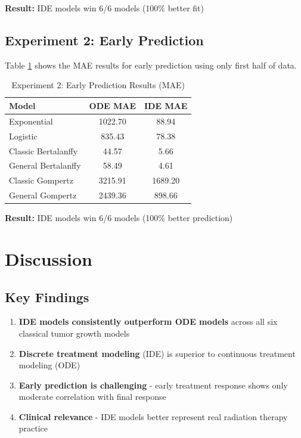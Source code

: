 \documentclass[11pt]{article}
\begin{document}
\textbf{Result:} IDE models win 6/6 models (100\% better fit)

\subsection{Experiment 2: Early Prediction}

Table \ref{tab:exp2} shows the MAE results for early prediction using only first half of data.

\begin{table}[h]
\centering
\caption{Experiment 2: Early Prediction Results (MAE)}
\label{tab:exp2}
\begin{tabular}{@{}lcc@{}}
\toprule
Model & ODE MAE & IDE MAE \\
\midrule
Exponential & 1022.70 & 88.94 \\
Logistic & 835.43 & 78.38 \\
Classic Bertalanffy & 44.57 & 5.66 \\
General Bertalanffy & 58.49 & 4.61 \\
Classic Gompertz & 3215.91 & 1689.20 \\
General Gompertz & 2439.36 & 898.66 \\
\bottomrule
\end{tabular}
\end{table}

\textbf{Result:} IDE models win 6/6 models (100\% better prediction)

\section{Discussion}

\subsection{Key Findings}

\begin{enumerate}
    \item \textbf{IDE models consistently outperform ODE models} across all six classical tumor growth models
    \item \textbf{Discrete treatment modeling} (IDE) is superior to continuous treatment modeling (ODE)
    \item \textbf{Early prediction is challenging} - early treatment response shows only moderate correlation with final response
    \item \textbf{Clinical relevance} - IDE models better represent real radiation therapy practice
\end{enumerate}
\end{document}
